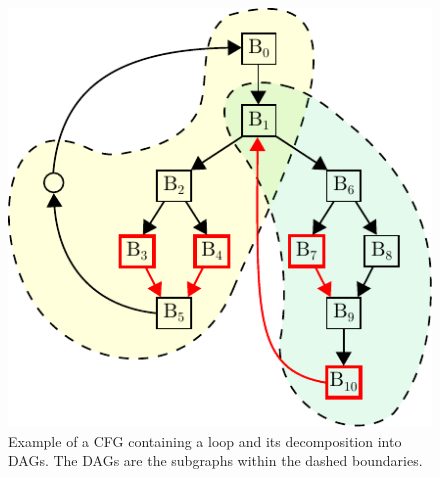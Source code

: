 \begin{figure}[t]
  \centering
  \includegraphics[scale=0.75]{figs/cfg-relax-example.pdf}
  \caption{Example of a CFG containing a loop and its decomposition into DAGs.
           The DAGs are the subgraphs within the dashed boundaries.}
  \label{fig:cfg-relax-example}
\end{figure}



